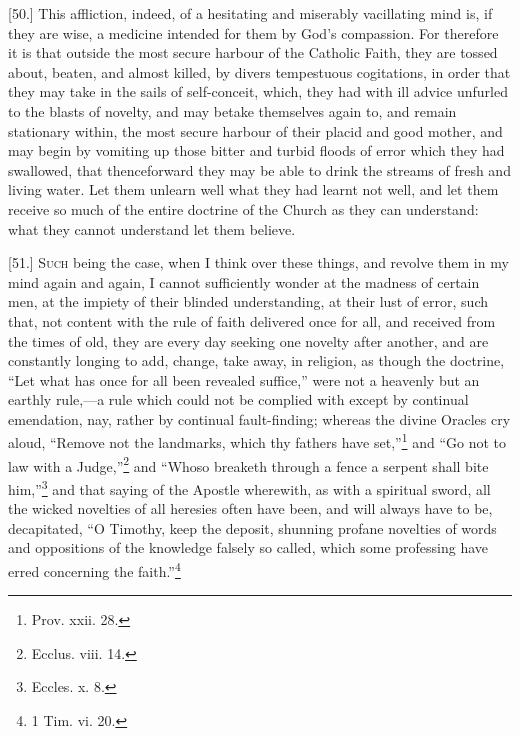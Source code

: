 [50.] This affliction, indeed, of a hesitating and miserably vacillating mind is, if they are wise, a medicine intended for them by God’s compassion. For therefore it is that outside the most secure harbour of the Catholic Faith, they are tossed about, beaten, and almost killed, by divers tempestuous cogitations, in order that they may take in the sails of self-conceit, which, they had with ill advice unfurled to the blasts of novelty, and may betake themselves again to, and remain stationary within, the most secure harbour of their placid and good mother, and may begin by vomiting up those bitter and turbid floods of error which they had swallowed, that thenceforward they may be able to drink the streams of fresh and living water. Let them unlearn well what they had learnt not well, and let them receive so much of the entire doctrine of the Church as they can understand: what they cannot understand let them believe.


[51.] \textsc{Such} being the case, when I think over these things, and revolve them in my mind again and again, I cannot sufficiently wonder at the madness of certain men, at the impiety of their blinded understanding, at their lust of error, such that, not content with the rule of faith delivered once for all, and received from the times of old, they are every day seeking one novelty after another, and are constantly longing to add, change, take away, in religion, as though the doctrine, “Let what has once for all been revealed suffice,” were not a heavenly but an earthly rule,—a rule which could not be complied with except by continual emendation, nay, rather by continual fault-finding; whereas the divine Oracles cry aloud, “Remove not the landmarks, which thy fathers have set,”\footnote{Prov. xxii. 28.} and “Go not to law with a Judge,”\footnote{Ecclus. viii. 14.} and “Whoso breaketh through a fence a serpent shall bite him,”\footnote{Eccles. x. 8.} and that saying of the Apostle wherewith, as with a spiritual sword, all the wicked novelties of all heresies often have been, and will always have to be, decapitated, “O Timothy, keep the deposit, shunning profane novelties of words and oppositions of the knowledge falsely so called, which some professing have erred concerning the faith.”\footnote{1 Tim. vi. 20.}

